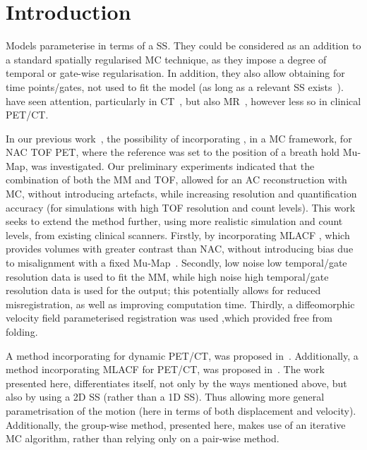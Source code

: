 \section{Introduction} \label{sec:introduction}
     Models parameterise  in terms of a \gls{SS}. They could be considered as an addition to a standard spatially regularised \gls{MC} technique, as they impose a degree of temporal or gate-wise regularisation. In addition, they also allow obtaining  for time points/gates, not used to fit the model (as long as a relevant \gls{SS} exists~\cite{McClelland2013}).  have seen attention, particularly in \acrshort{CT}~\cite{Li2007EnhancedModel}, but also \acrshort{MR}~\cite{Manke2002RespiratoryModels, Manber2016JointCorrection.}, however less so in clinical \acrshort{PET}/\acrshort{CT}.
    
    In our previous work~\cite{Whitehead2019ImpactPET, Whitehead2020PET/CTFields, Whitehead2021ComparisonMap}, the possibility of incorporating , in a \gls{MC} framework, for \gls{NAC} \gls{TOF} \acrshort{PET}, where the reference was set to the position of a breath hold \gls{Mu-Map}, was investigated. %
    Our preliminary experiments indicated that the combination of both the \gls{MM} and \gls{TOF}, allowed for an \gls{AC} reconstruction with \gls{MC}, without introducing artefacts, while increasing resolution and quantification accuracy (for simulations with high \gls{TOF} resolution and count levels). This work seeks to extend the method further, using more realistic simulation and count levels, from existing clinical scanners. Firstly, by incorporating \acrshort{MLACF} %
    , which provides volumes with greater contrast than \gls{NAC}, without introducing bias due to misalignment with a fixed \gls{Mu-Map}~\cite{Nuyts2012ML-reconstructionFactors}. Secondly, low noise low temporal/gate resolution data is used to fit the \gls{MM}, while high noise high temporal/gate resolution data is used for the output; this potentially allows for reduced misregistration, as well as improving computation time. Thirdly, a diffeomorphic velocity field parameterised registration was used ,which provided  free from folding.
    
    A method incorporating  for dynamic \acrshort{PET}/\acrshort{CT}, was proposed in~\cite{Chan2018Non-RigidPET}. Additionally, a method incorporating \acrshort{MLACF} for \acrshort{PET}/\acrshort{CT}, was proposed in~\cite{Lu2018RespiratoryData}. The work presented here, differentiates itself, not only by the ways mentioned above, but also by using a \acrshort{2D} \gls{SS} (rather than a \acrshort{1D} \gls{SS}). Thus allowing more general parametrisation of the motion (here in terms of both displacement and velocity). Additionally, the group-wise method, presented here, makes use of an iterative \gls{MC} algorithm, rather than relying only on a pair-wise method.

